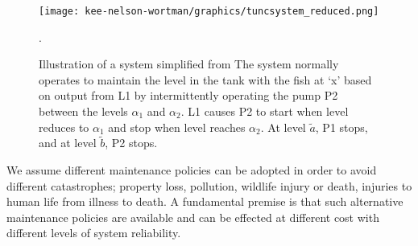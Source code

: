 \documentclass[review]{elsarticle}
\begin{document}
	\begin{figure}[ht]
	\centering
	\texttt{[image: kee-nelson-wortman/graphics/tuncsystem\_reduced.png]}
	\caption{Illustration of a system simplified from \citet{t2013}The system normally operates to maintain 
	the level in the tank with the fish at `x' based on output from L1 by intermittently  operating the pump 
	P2 between the levels $\alpha_1$ and $\alpha_2$. L1 causes P2 to  start when level reduces to 
	$\alpha_1$ and stop when level reaches $\alpha_2$. At level  $\tilde{a}$, P1 stops, and at level 
	$\tilde{b}$, P2 stops.}. 
	\label{fig:tuncsystem_reduced}
	\end{figure}
	
	We assume different maintenance policies can be adopted in order to avoid different catastrophes; 
	property loss, pollution, wildlife injury or death, injuries to human life from illness to death.
	A fundamental premise is that such alternative maintenance policies are available and
	can be effected at different cost with different levels of system reliability.
\end{document}
